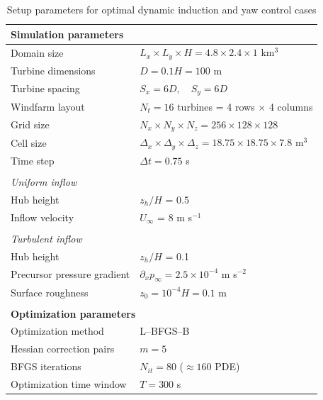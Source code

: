 \documentclass[energies,article,submit,moreauthors,latex,10pt,a4paper]{mdpi}
\begin{document}
\begin{table}
	\caption{Setup parameters for optimal dynamic induction and yaw control cases \label{tab:case_definition}}
	\centering
	\begin{tabular}{llccc}
		\toprule
		\multicolumn{5}{l}{\textbf{Simulation parameters}}\\
		\midrule
		Domain size  			& \multicolumn{4}{l}{$L_x \times L_y \times H = 4.8 \times 2.4 \times 1$ km$^3$}  \\ 
		Turbine dimensions  		& \multicolumn{4}{l}{$D = 0.1H = 100$ m}\\ 
		Turbine spacing  		& \multicolumn{4}{l}{$S_x = 6D, \quad S_y = 6D$}\\
		Windfarm layout 		& \multicolumn{4}{l}{$N_t = 16 $ turbines = 4 rows $\times$ 4 columns} \\ 
		Grid size 			& \multicolumn{4}{l}{$N_x \times N_y \times N_z = 256 \times 128 \times 128$}\\
		Cell size 			& \multicolumn{4}{l}{$\Delta_x \times \Delta_y \times \Delta_z = 18.75 \times 18.75 \times 7.8$ m$^3$}\\
		Time step 			& \multicolumn{4}{l}{$\Delta t = 0.75$ s}\\		
		& & & & \\	
		\multicolumn{5}{l}{\textit{Uniform inflow}}\\
		Hub height & \multicolumn{4}{l}{$z_h/H$ = 0.5}\\
		Inflow velocity & \multicolumn{4}{l}{$U_\infty$ = 8 m s$^{-1}$}\\
		& & & & \\			
		\multicolumn{5}{l}{\textit{Turbulent inflow}}\\
		Hub height & \multicolumn{4}{l}{$z_h/H$ = 0.1}\\		
		Precursor pressure gradient  	& \multicolumn{4}{l}{$ \partial_x p_\infty = 2.5 \times 10^{-4}$ m s$^{-2}$}  \\ 
		Surface roughness  &  \multicolumn{4}{l}{$z_0 = 10^{-4}H = 0.1$ m}\\ 		
		& & & & \\	
		\toprule
		\multicolumn{5}{l}{\textbf{Optimization parameters}}\\
		\midrule
		Optimization method		& \multicolumn{4}{l}{L--BFGS--B} \\
		Hessian correction pairs	& \multicolumn{4}{l}{$m = 5$} \\
		BFGS iterations 		& \multicolumn{4}{l}{$N_{it} = 80$ ($\approx 160$ PDE)} \\
		Optimization time window	& \multicolumn{4}{l}{$T = 300$ s}\\

\end{tabular}
\end{table}
\end{document}
